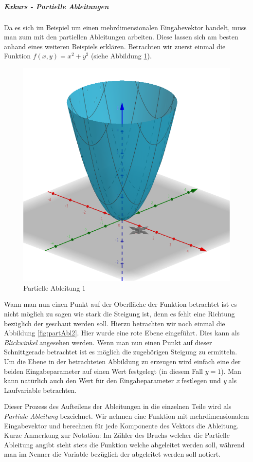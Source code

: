 \subparagraph{Exkurs - Partielle Ableitungen \cite{partAbl}}
Da es sich im Beispiel um einen mehrdimensionalen Eingabevektor handelt, muss man zum mit den partiellen Ableitungen arbeiten. Diese lassen sich am besten anhand eines weiteren Beispiels erklären. Betrachten wir zuerst einmal die Funktion ${{f(x, y) = x^2 + y^2}}$ (siehe Abbildung \ref{fig:partAbl1}). 

\begin{figure}[!htb]
	\centering
	\includegraphics[width=.6\linewidth]{img/partAbl_1}
	\caption[Partielle Ableitung 1]{Partielle Ableitung 1 \protect\footnotemark}
	\label{fig:partAbl1}
\end{figure}

\FloatBarrier
{}

Wann man nun einen Punkt auf der Oberfläche der Funktion betrachtet ist es nicht möglich zu sagen wie stark die Steigung ist, denn es fehlt eine Richtung bezüglich der \glqq geschaut \grqq werden soll. Hierzu betrachten wir noch einmal die Abbildung \ref{fig:partAbl2}. Hier wurde eine \glqq rote Ebene \glqq eingeführt. Dies kann als \emph{Blickwinkel} angesehen werden. Wenn man nun einen Punkt auf dieser Schnittgerade betrachtet ist es möglich die zugehörigen Steigung zu ermitteln. Um die Ebene in der betrachteten Abbildung zu erzeugen wird einfach eine der beiden Eingabeparameter auf einen Wert festgelegt (in diesem Fall ${y=1}$). Man kann natürlich auch den Wert für den Eingabeparameter \emph{x} festlegen und \emph{y} als Laufvariable betrachten. 

Dieser Prozess des Aufteilens der Ableitungen in die einzelnen Teile wird als \emph{Partiale Ableitung} bezeichnet. Wir nehmen eine Funktion mit mehrdimensionalem Eingabevektor und berechnen für jede Komponente des Vektors die Ableitung. Kurze Anmerkung zur Notation: Im Zähler des Bruchs welcher die Partielle Ableitung angibt steht stets die Funktion welche abgeleitet werden soll, während man im Nenner die Variable bezüglich der abgeleitet werden soll notiert.


